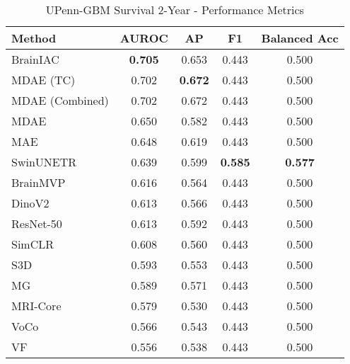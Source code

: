 \begin{table}[ht]
\centering
\caption{UPenn-GBM Survival 2-Year - Performance Metrics}
\label{tab:upenn_gbm_survival_2year}
\begin{tabular}{lcccc}
\toprule
Method & AUROC & AP & F1 & Balanced Acc \\
\midrule
BrainIAC & \textbf{0.705} & 0.653 & 0.443 & 0.500 \\
MDAE (TC) & 0.702 & \textbf{0.672} & 0.443 & 0.500 \\
MDAE (Combined) & 0.702 & 0.672 & 0.443 & 0.500 \\
MDAE & 0.650 & 0.582 & 0.443 & 0.500 \\
MAE & 0.648 & 0.619 & 0.443 & 0.500 \\
SwinUNETR & 0.639 & 0.599 & \textbf{0.585} & \textbf{0.577} \\
BrainMVP & 0.616 & 0.564 & 0.443 & 0.500 \\
DinoV2 & 0.613 & 0.566 & 0.443 & 0.500 \\
ResNet-50 & 0.613 & 0.592 & 0.443 & 0.500 \\
SimCLR & 0.608 & 0.560 & 0.443 & 0.500 \\
S3D & 0.593 & 0.553 & 0.443 & 0.500 \\
MG & 0.589 & 0.571 & 0.443 & 0.500 \\
MRI-Core & 0.579 & 0.530 & 0.443 & 0.500 \\
VoCo & 0.566 & 0.543 & 0.443 & 0.500 \\
VF & 0.556 & 0.538 & 0.443 & 0.500 \\
\bottomrule
\end{tabular}
\end{table}

